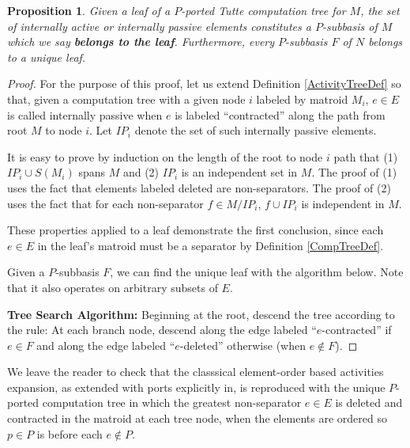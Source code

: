 \documentclass[12pt,leqno]{amsart}
\newtheorem{prop}[lem]{Proposition}
\theoremstyle{remark}
\begin{document}
\begin{prop}
Given a leaf of a $P$-ported Tutte computation tree for $M$,
the set of internally active or internally passive elements 
constitutes a 
$P$-subbasis of $M$ which we say 
\textbf{belongs to the leaf}.  
Furthermore, every $P$-subbasis $F$ of $N$ belongs to a unique leaf.
\end{prop}

\begin{proof}
For the purpose of this proof, let us extend Definition \ref{ActivityTreeDef}
so that, given a computation tree with a given node $i$ 
labeled by matroid $M_i$,
$e\in E$ is called internally passive when $e$ is labeled 
``contracted'' along the path from root $M$ to
node $i$.  Let $IP_i$ denote the set of such internally passive 
elements.

It is easy to prove by induction on the length of the root to node $i$ path
that
(1) $IP_i\cup S(M_i)$ spans $M$ and 
(2) $IP_i$ is an independent set in $M$.  The proof
of (1) uses the fact that elements labeled deleted are non-separators.  The
proof of (2) uses the fact that for each non-separator 
$f\in M/IP_i$, $f\cup IP_i$ is independent in $M$.

These properties applied to a leaf demonstrate the first conclusion,
since each $e\in E$ in the leaf's matroid must be a separator by Definition 
\ref{CompTreeDef}.

Given a $P$-subbasis $F$, we can find the unique leaf with the
algorithm below.  Note that it also operates on arbitrary subsets of $E$.

\textbf{Tree Search Algorithm:} Beginning
at the root, descend the tree according to the rule: At each branch node,
descend along the edge labeled ``$e$-contracted'' if $e\in F$ and along
the edge labeled ``$e$-deleted'' otherwise (when $e\not\in F$).
\end{proof}

We leave the reader to check that 
the classsical element-order based activities
expansion, as extended with ports explicitly
in\cite{RelTuttePoly}, is reproduced with 
the unique $P$-ported
computation tree in which the greatest non-separator $e\in E$ is
deleted and contracted in the matroid at each tree node,
when the elements are ordered
so $p\in P$ is 
before each $e\not\in P$.
\end{document}
